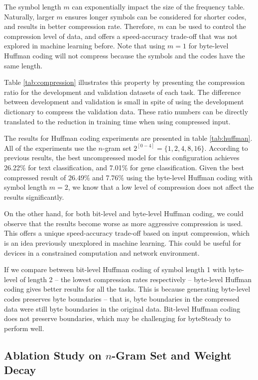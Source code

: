 \documentclass{article}
\begin{document}
The symbol length \(m\) can exponentially impact the size of the frequency table. Naturally, larger \(m\) ensures longer symbols can be considered for shorter codes, and results in better compression rate. Therefore, \(m\) can be used to control the compression level of data, and offers a speed-accuracy trade-off that was not explored in machine learning before. Note that using \(m=1\) for byte-level Huffman coding will not compress because the symbols and the codes have the same length.

Table \ref{tab:compression} illustrates this property by presenting the compression ratio for the development and validation datasets of each task. The difference between development and validation is small in spite of using the development dictionary to compress the validation data. These ratio numbers can be directly translated to the reduction in training time when using compressed input.

The results for Huffman coding experiments are presented in table \ref{tab:huffman}. All of the experiments use the \(n\)-gram set \(2^{[0-4]} = \{1,2,4,8,16\}\). According to previous results, the best uncompressed model for this configuration achieves 26.22\% for text classification, and 7.01\% for gene classification. Given the best compressed result of 26.49\% and 7.76\% using the byte-level Huffman coding with symbol length \(m=2\), we know that a low level of compression does not affect the results significantly.

On the other hand, for both bit-level and byte-level Huffman coding, we could observe that the results become worse as more aggressive compression is used. This offers a unique speed-accuracy trade-off based on input compression, which is an idea previously unexplored in machine learning. This could be useful for devices in a constrained computation and network environment.

If we compare between bit-level Huffman coding of symbol length 1 with byte-level of length 2 -- the lowest compression rates respectively -- byte-level Huffman coding gives better results for all the tasks. This is because generating byte-level codes preserves byte boundaries -- that is, byte boundaries in the compressed data were still byte boundaries in the original data. Bit-level Huffman coding does not preserve boundaries, which may be challenging for byteSteady to perform well.

\subsection{Ablation Study on \(n\)-Gram Set and Weight Decay}
\end{document}
